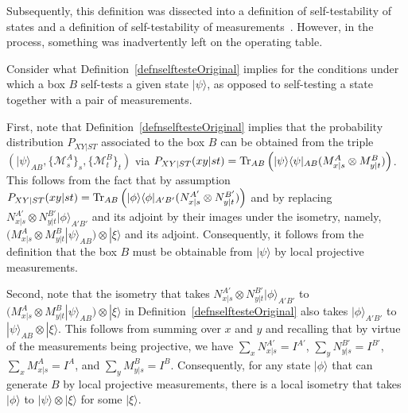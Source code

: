 \documentclass[prx,11pt,letterpaper,twocolumn,accepted=2023-11-27]{quantumarticle}
\theoremstyle{plain}
\theoremstyle{definition}
\begin{document}
\begin{appendices}
Subsequently, this definition was dissected into a definition of self-testability of states and a definition of self-testability of measurements~\cite{ScaraniStateSelfTest2009,JedWeak2020,Coladangelo2017,vsupic2020self}.  However, in the process, something was inadvertently left  on the operating table.  

Consider what Definition~\ref{defnselftesteOriginal} implies for the conditions under which a box $B$ self-tests a given state $|\psi\rangle$, as opposed to self-testing a state together with a pair of measurements. 

First, note that Definition~\ref{defnselftesteOriginal} implies that the probability distribution $P_{XY|ST}$ associated to the box $B$ can be obtained from the triple $(|\psi\rangle_{AB}, \{ \mathcal{M}^A_s\}_s, \{\mathcal{M}^B_t\}_t)$ via $P_{XY|ST}(xy|st)= {\rm Tr}_{AB}\left(|\psi\rangle \langle \psi|_{AB} (M^{A}_{x|s} \otimes M^{B}_{y|t}) \right)$.  
This follows from the fact that by assumption $P_{XY|ST}(xy|st)= {\rm Tr}_{AB}\left(|\phi\rangle \langle \phi|_{A'B'} (N^{A'}_{x|s} \otimes N^{B'}_{y|t}) \right)$ and by replacing $N^{A'}_{x|s} \otimes N^{B'}_{y|t}|\phi\rangle_{A'B'}$ and its adjoint by their images under the isometry, namely, $\big( M^{A}_{x|s} \otimes M^{B}_{y|t} |\psi\rangle_{AB} \big) \otimes |\xi\rangle$ and its adjoint.
Consequently, it follows from the definition that the box $B$ must be obtainable from $|\psi\rangle$ by local projective measurements. 
 
Second, note that 
 the isometry that takes $N^{A'}_{x|s} \otimes N^{B'}_{y|t}|\phi\rangle_{A'B'}$ to $\big( M^{A}_{x|s} \otimes M^{B}_{y|t}|\psi\rangle_{AB} \big) \otimes |\xi\rangle$ in Definition~\ref{defnselftesteOriginal} also takes $|\phi\rangle_{A'B'}$ to $|\psi\rangle_{AB} \otimes |\xi\rangle$.  This follows from summing over $x$ and $y$ and recalling that by virtue of the measurements being projective, we have $\sum_x  N^{A'}_{x|s} =I^{A'}$, $\sum_y  N^{B'}_{y|s} =I^{B'}$, $\sum_x  M^{A}_{x|s} =I^{A}$, and $\sum_y  M^{B}_{y|s} =I^{B}$.  Consequently, for any state $|\phi\rangle$ that can generate $B$ by local projective measurements, there is a local isometry that takes $|\phi\rangle$ to $|\psi\rangle \otimes |\xi \rangle$ for some $|\xi\rangle$.  


\end{appendices}
\end{document}
